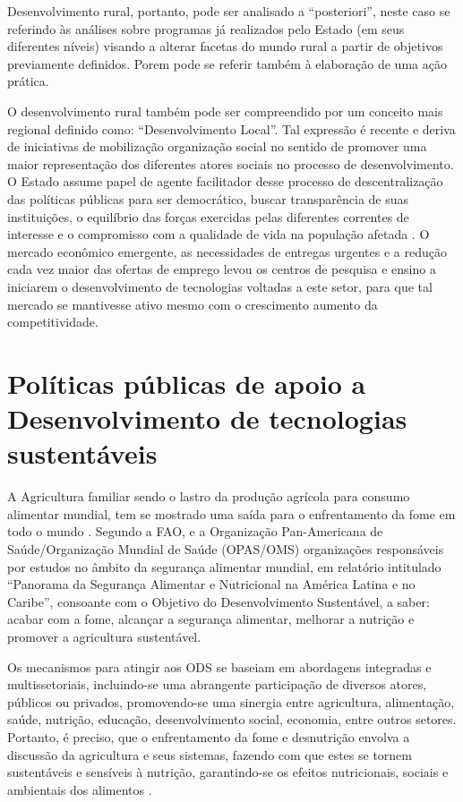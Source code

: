 \begin{citacao}
[...] Desenvolvimento rural, portanto, pode ser analisado a “posteriori”, neste caso se referindo às análises sobre programas já realizados pelo Estado (em seus diferentes níveis) visando a alterar facetas do mundo rural a partir de objetivos previamente definidos. Porem pode se referir também à elaboração de uma ação prática.
\end{citacao}

O desenvolvimento rural também pode ser compreendido por um conceito mais regional definido como: “Desenvolvimento Local”. Tal expressão é recente e deriva de iniciativas de mobilização organização social no sentido de promover uma maior representação dos diferentes atores sociais no processo de desenvolvimento. O Estado assume papel de agente facilitador desse processo de descentralização das políticas públicas para ser democrático, buscar transparência de suas instituições, o equilíbrio das forças exercidas pelas diferentes correntes de interesse e o compromisso com a qualidade de vida na população afetada \cite{castro_agricultura_2017}. O mercado econômico emergente, as necessidades de entregas urgentes e a redução cada vez maior das ofertas de emprego levou os centros de pesquisa e ensino a iniciarem o desenvolvimento de tecnologias voltadas a este setor, para que tal mercado se mantivesse ativo mesmo com o crescimento aumento da competitividade. 

\section{Políticas públicas de apoio a Desenvolvimento de tecnologias sustentáveis}

A Agricultura familiar sendo o lastro da produção agrícola para consumo alimentar mundial, tem se mostrado uma saída para o enfrentamento da fome em todo o mundo \cite{fao_innovation_2014}. Segundo a FAO, e a Organização Pan-Americana de Saúde/Organização Mundial de Saúde (OPAS/OMS) \cite{fao_panorama_2017} organizações responsáveis por estudos no âmbito da segurança alimentar mundial, em relatório intitulado “Panorama da Segurança Alimentar e Nutricional na América Latina e no Caribe”, consoante com o Objetivo do Desenvolvimento Sustentável, a saber: acabar com a fome, alcançar a segurança alimentar, melhorar a nutrição e promover a agricultura sustentável. 

Os mecanismos para atingir aos ODS se baseiam em abordagens integradas e multissetoriais, incluindo-se uma abrangente participação de diversos atores, públicos ou privados, promovendo-se uma sinergia entre agricultura, alimentação, saúde, nutrição, educação, desenvolvimento social, economia, entre outros setores. Portanto, é preciso, que o enfrentamento da fome e desnutrição envolva a discussão da agricultura e seus sistemas, fazendo com que estes se tornem sustentáveis e sensíveis à nutrição, garantindo-se os efeitos nutricionais, sociais e ambientais dos alimentos \cite{silva_agenda_2018}.

